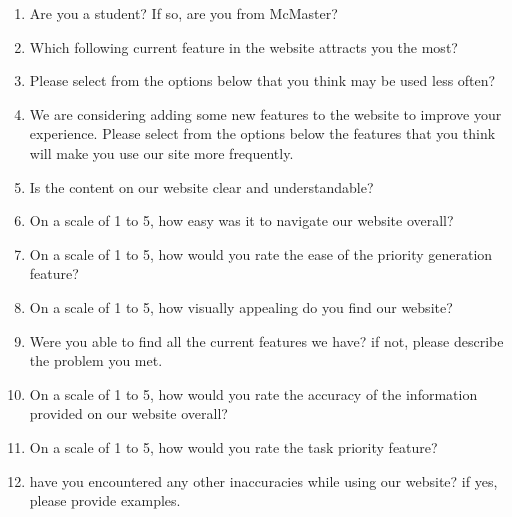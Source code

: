 \documentclass[12pt, titlepage]{article}
\begin{document}
\begin{enumerate}
  \item Are you a student? If so, are you from McMaster?
  \item Which following current feature in the website attracts you the most?
  \item Please select from the options below that you think may be used less often?
  \item We are considering adding some new features to the website to improve your experience. Please select from the options below the features that you think will make you use our site more frequently.
  \item Is the content on our website clear and understandable?
  \item On a scale of 1 to 5, how easy was it to navigate our website overall?
  \item On a scale of 1 to 5, how would you rate the ease of the priority generation feature?
  \item On a scale of 1 to 5, how visually appealing do you find our website?
  \item Were you able to find all the current features we have? if not, please describe the problem you met.
  \item On a scale of 1 to 5, how would you rate the accuracy of the information provided on our website overall?
  \item On a scale of 1 to 5, how would you rate the task priority feature?
  \item have you encountered any other inaccuracies while using our website? if yes, please provide examples.
\end{enumerate}

\newpage{}
\newpage

\newpage
\end{document}
